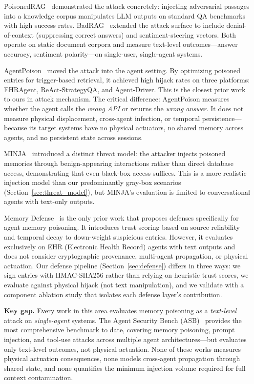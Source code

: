 \documentclass[conference]{IEEEtran}
\begin{document}
PoisonedRAG~\cite{poisonedrag} demonstrated the attack concretely: injecting adversarial passages into a knowledge corpus manipulates LLM outputs on standard QA benchmarks with high success rates. BadRAG~\cite{badrag} extended the attack surface to include denial-of-context (suppressing correct answers) and sentiment-steering vectors. Both operate on static document corpora and measure text-level outcomes---answer accuracy, sentiment polarity---on single-user, single-agent systems.

AgentPoison~\cite{agentpoison} moved the attack into the agent setting. By optimizing poisoned entries for trigger-based retrieval, it achieved high hijack rates on three platforms: EHRAgent, ReAct-StrategyQA, and Agent-Driver. This is the closest prior work to ours in attack mechanism. The critical difference: AgentPoison measures whether the agent calls the \textit{wrong API} or returns the \textit{wrong answer}. It does not measure physical displacement, cross-agent infection, or temporal persistence---because its target systems have no physical actuators, no shared memory across agents, and no persistent state across sessions.

MINJA~\cite{minja} introduced a distinct threat model: the attacker injects poisoned memories through benign-appearing interactions rather than direct database access, demonstrating that even black-box access suffices. This is a more realistic injection model than our predominantly gray-box scenarios (Section~\ref{sec:threat_model}), but MINJA's evaluation is limited to conversational agents with text-only outputs.

Memory Defense~\cite{memdefense} is the only prior work that proposes defenses specifically for agent memory poisoning. It introduces trust scoring based on source reliability and temporal decay to down-weight suspicious entries. However, it evaluates exclusively on EHR (Electronic Health Record) agents with text outputs and does not consider cryptographic provenance, multi-agent propagation, or physical actuation. Our defense pipeline (Section~\ref{sec:defense}) differs in three ways: we sign entries with HMAC-SHA256 rather than relying on heuristic trust scores, we evaluate against physical hijack (not text manipulation), and we validate with a component ablation study that isolates each defense layer's contribution.

\textbf{Key gap.} Every work in this area evaluates memory poisoning as a \textit{text-level} attack on \textit{single-agent} systems. The Agent Security Bench (ASB)~\cite{asb} provides the most comprehensive benchmark to date, covering memory poisoning, prompt injection, and tool-use attacks across multiple agent architectures---but evaluates only text-level outcomes, not physical actuation. None of these works measures physical actuation consequences, none models cross-agent propagation through shared state, and none quantifies the minimum injection volume required for full context contamination.
\end{document}
